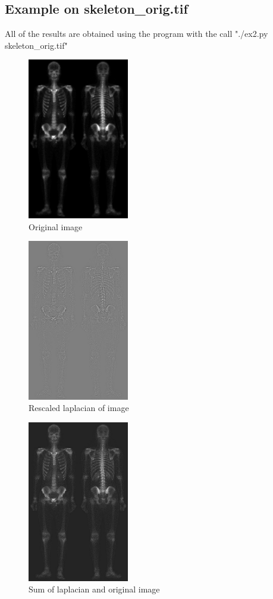 \documentclass[10pt]{article}
\begin{document}
\subsection{Example on skeleton\_orig.tif}
All of the results are obtained using the program with the call "./ex2.py skeleton\_orig.tif"
\begin{figure}[!ht]
	\centering
	\includegraphics[height=200pt]{./ex2/skeleton_orig.jpg}
	\caption{Original image}
\end{figure}
\begin{figure}[!ht]
	\centering
	\includegraphics[height=200pt]{./ex2/skeleton_lap.jpg}
	\caption{Rescaled laplacian of image}
\end{figure}
\begin{figure}[!ht]
	\centering
	\includegraphics[height=200pt]{./ex2/skeleton_lap_plus_orig.jpg}
	\caption{Sum of laplacian and original image}
\end{figure}
\end{document}
